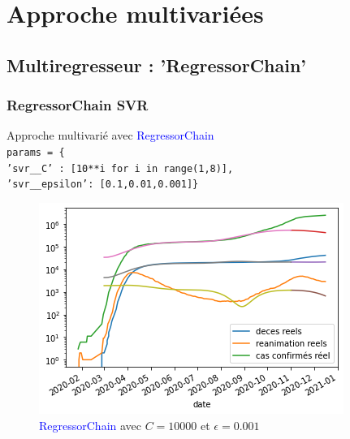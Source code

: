 \documentclass{beamer}[aspectratio = 43]
\begin{document}
\section{Approche multivariées}
\subsection*{Multiregresseur : 'RegressorChain'}
\begin{frame}
	\frametitle{RegressorChain SVR}
	Approche multivarié avec \textcolor{blue}{RegressorChain}\\
	\texttt{params = \{\\'svr\_\_C' : [10**i for i in range(1,8)],\\ 
	'svr\_\_epsilon': [0.1,0.01,0.001]\}}\\
	\begin{figure}[h]
		\includegraphics[scale=0.5]{mr_c10000_eps0001}
		\caption{ \textcolor{blue}{RegressorChain} avec $C = 10000$ et $\epsilon = 0.001$}
	\end{figure}
\end{frame}
\end{document}
